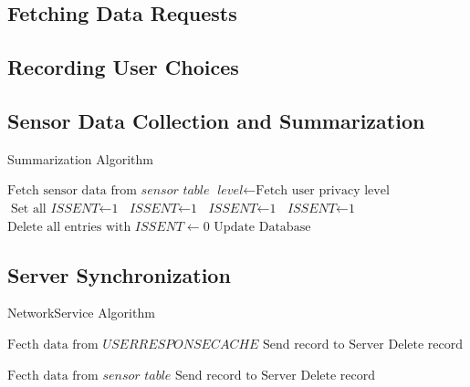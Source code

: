 \subsection{Fetching Data Requests}




\subsection{Recording User Choices}

\subsection{Sensor Data Collection and Summarization}

\begin{algorithm}
\caption{Summarization Algorithm}\label{sum}
\begin{algorithmic}[1]
\State $\text{Fetch sensor data from } \textit{sensor table}$
\State $\textit{level} \gets \text{Fetch user privacy level}$
  \State $\text{Set all } \textit{ISSENT} \gets \text{1}$
 	 \State $\textit{ISSENT} \gets \text{1}$
 	\EndFor 
{}
 	 \State $\textit{ISSENT} \gets \text{1}$
 	\EndFor
{}
 	 \State $\textit{ISSENT} \gets \text{1}$
 	\EndFor
\EndIf
\State $\text{Delete all entries with } \textit{ISSENT} \gets 0$
\State $\text{Update Database}$
\EndFor
\EndProcedure
\end{algorithmic}
\end{algorithm}

\subsection{Server Synchronization}
\begin{algorithm}
\caption{NetworkService Algorithm}\label{nextday}
\begin{algorithmic}[1]
\State $ \text{Fecth data from } \textit{USERRESPONSECACHE}$
  \State $\text{Send record to Server}$
\Else
  \State $\text{Delete record}$ 
  \EndIf
 	\EndFor

 	 \State $ \text{Fecth data from } \textit{sensor table}$
  \State $\text{Send record to Server}$
	\Else
  \State $\text{Delete record}$
  \EndIf
 	\EndFor
	
 	\EndFor
\EndProcedure
\end{algorithmic}
\end{algorithm}




